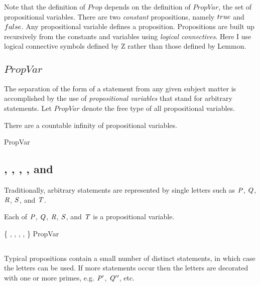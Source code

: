 \documentclass[11pt, oneside]{article}
\begin{document}
Note that the definition of $Prop$ depends on the definition of $PropVar$, the set of propositional variables.
There are two {\it constant} propositions, namely $true$ and $false$.
Any propositional variable defines a proposition.
Propositions are built up recursively from the constants and variables using {\it logical connectives}.
Here I use logical connective symbols defined by Z rather than those defined by Lemmon.

\subsection{$PropVar$}

The separation of the form of a statement from any given subject matter is accomplished by 
the use of {\it propositional variables} that stand for arbitrary statements.
Let $PropVar$ denote the free type of all propositional variables.

\begin{remark}
There are a countable infinity of propositional variables.

\begin{zed}
	PropVar \bij \nat \neq \emptyset
\end{zed}

\end{remark}

\subsection{, , , , and }

Traditionally, arbitrary statements are represented by single letters such as
$\mathit{P}$, $\mathit{Q}$, $\mathit{R}$, $\mathit{S}$, and $\mathit{T}$.

\begin{remark}
Each of $\mathit{P}$, $\mathit{Q}$, $\mathit{R}$, $\mathit{S}$, and $\mathit{T}$ is a propositional variable.

\begin{zed}
	\{ \propP, \propQ, \propR, \propS, \propT \} \subset PropVar
\end{zed}

\end{remark}

\subsection{}

Typical propositions contain a small number of distinct statements, in which case the letters can be used.
If more statements occur then the letters are decorated with one or more primes, 
e.g. $\mathit{P} {'}$, $\mathit{Q} {'} {'}$, etc.
\end{document}
